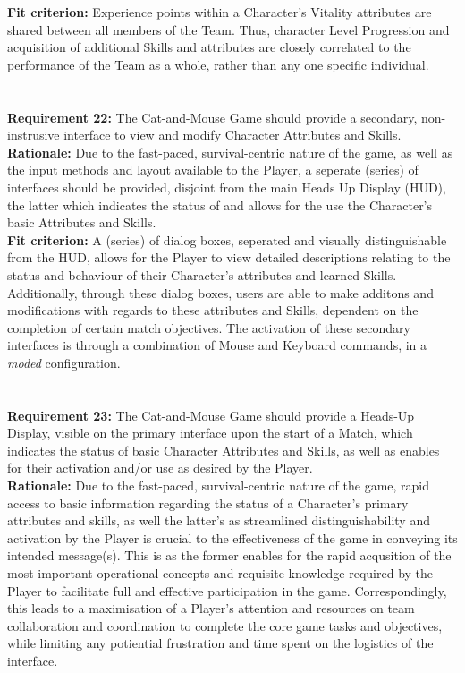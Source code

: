 \documentclass[12pt, titlepage]{article}
\begin{document}
\textbf{Fit criterion:}  Experience points within a Character's Vitality attributes are shared between all members of the Team. Thus, character Level Progression and acquisition of additional Skills and attributes are closely correlated to the performance of the Team as a whole, rather than any one specific individual.
\\
\\
\\ \textbf{Requirement 22:}  The Cat-and-Mouse Game should provide a secondary, non-instrusive interface to view and modify Character Attributes and Skills.  \\
\textbf{Rationale:} Due to the fast-paced, survival-centric nature of the game, as well as the input methods and layout available to the Player, a seperate (series) of interfaces should be provided, disjoint from the main Heads Up Display (HUD), the latter which indicates the status of and allows for the use the Character's basic Attributes and Skills.  \\
\textbf{Fit criterion:}  A (series) of dialog boxes, seperated and visually distinguishable from the HUD, allows for the Player to view detailed descriptions relating to the status and behaviour of their Character's attributes and learned Skills. Additionally, through these dialog boxes, users are able to make additons and modifications with regards to these attributes and Skills, dependent on the completion of certain match objectives. The activation of these secondary interfaces is through a combination of Mouse and Keyboard commands, in a \emph{moded} configuration.
\\
\\
\\ \textbf{Requirement 23:}  The Cat-and-Mouse Game should provide a Heads-Up Display, visible on the primary interface upon the start of a Match, which indicates the status of basic Character Attributes and Skills, as well as enables for their activation and/or use as desired by the Player. \\
\textbf{Rationale:} Due to the fast-paced, survival-centric nature of the game, rapid access to basic information regarding the status of a Character's primary attributes and skills, as well the latter's as streamlined distinguishability and activation by the Player is crucial to the effectiveness of the game in conveying its intended message(s). This is as the former  enables for the rapid acqusition of the most important operational concepts and requisite knowledge required by the Player to facilitate  full and effective participation in the game. Correspondingly, this leads to a maximisation of a Player's attention and resources on team collaboration and coordination to complete the core game tasks and objectives, while limiting any potiential frustration and time spent on the logistics of the interface. \\
\end{document}
